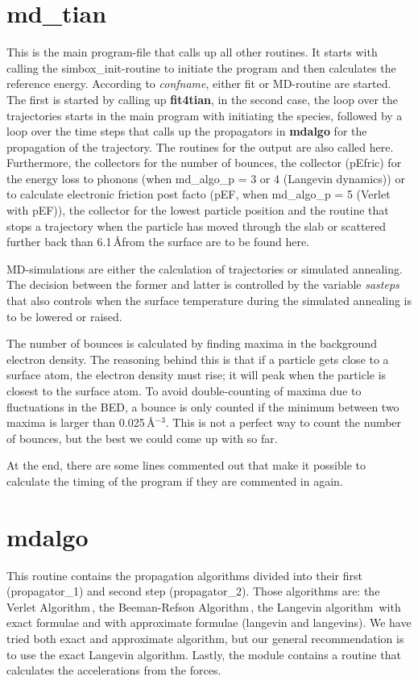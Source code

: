\documentclass[twoside, 11pt, titlepage, captions=nooneline, a4paper, headsepline]{scrbook}%
\newcommand{\9}{\mathrm}
\newcommand{\0}{\,\mathrm}
\begin{document}
\section{md\_tian}
This is the main program-file that calls up all other routines. It starts with calling the simbox\_init-routine to initiate the program and then calculates the reference energy. According to \textit{confname}, either fit or MD-routine are started. The first is started by calling up \textbf{fit4tian}, in the second case, the loop over the trajectories starts in the main program with initiating the species, followed by a loop over the time steps that calls up the propagators in \textbf{mdalgo} for the propagation of the trajectory. The routines for the output are also called here. Furthermore, the collectors for the number of bounces, the collector (pEfric) for the energy loss to phonons (when md\_algo\_p = 3 or 4 (Langevin dynamics)) or to calculate electronic friction post facto (pEF, when md\_algo\_p = 5 (Verlet with pEF)), the collector for the lowest particle position and the routine that stops a trajectory when the particle has moved through the slab or scattered further back than 6.1\,\AA from the surface are to be found here.

MD-simulations are either the calculation of trajectories or simulated annealing. The decision between the former and latter is controlled by the variable \textit{sasteps} that also controls when the surface temperature during the simulated annealing is to be lowered or raised.

The number of bounces is calculated by finding maxima in the background electron density. The reasoning behind this is that if a particle gets close to a surface atom, the electron density must rise; it will peak when the particle is closest to the surface atom. To avoid double-counting of maxima due to fluctuations in the BED, a bounce is only counted if the minimum between two maxima is larger than 0.025\,\AA$^{-3}$. This is not a perfect way to count the number of bounces, but the best we could come up with so far.

At the end, there are some lines commented out that make it possible to calculate the timing  of the program if they are commented in again.

\section{mdalgo}
This routine contains the propagation algorithms divided into their first (propagator\_1) and second step (propagator\_2). Those algorithms are: the Verlet Algorithm\,\cite{allen1989}, the Beeman-Refson Algorithm\,\cite{refson1985}, the Langevin algorithm\,\cite{allen1989} with exact formulae and with approximate formulae (langevin and langevins). We have tried both exact and approximate algorithm, but our general recommendation is to use the exact Langevin algorithm. Lastly, the module contains a routine that calculates the accelerations from the forces.
\end{document}
